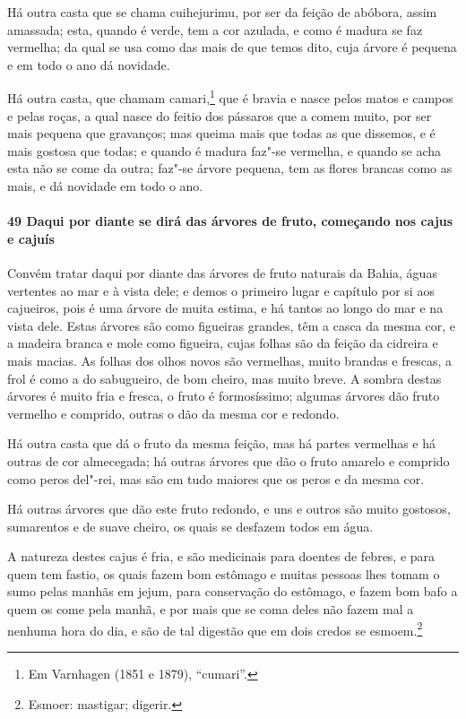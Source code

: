 Há outra casta que se chama cuihejurimu, por ser da feição de abóbora, assim amassada;
esta, quando é verde, tem a cor azulada, e como é madura se faz vermelha; da qual se usa
como das mais de que temos dito, cuja árvore é pequena e em todo o ano dá novidade.

Há outra casta, que chamam camari,\footnote{ Em Varnhagen (1851 e 1879), ``cumari''.} que
é bravia e nasce pelos matos e campos e pelas roças, a qual nasce do feitio dos pássaros
que a comem muito, por ser mais pequena que gravanços; mas queima mais que todas as que
dissemos, e é mais gostosa que todas; e quando é madura faz"-se vermelha, e quando se acha
esta não se come da outra; faz"-se árvore pequena, tem as flores brancas como as mais, e dá
novidade em todo o ano.

\paragraph{49 Daqui por diante se dirá das árvores de fruto, começando nos cajus e cajuís}

Convém tratar daqui por diante das árvores de fruto naturais da Bahia, águas vertentes ao
mar e à vista dele; e demos o primeiro lugar e capítulo por si aos cajueiros, pois é uma
árvore de muita estima, e há tantos ao longo do mar e na vista dele. Estas árvores são
como figueiras grandes, têm a casca da mesma cor, e a madeira branca e mole como figueira,
cujas folhas são da feição da cidreira e mais macias. As folhas dos olhos novos são
vermelhas, muito brandas e frescas, a frol é como a do sabugueiro, de bom cheiro, mas
muito breve. A sombra destas árvores é muito fria e fresca, o fruto é formosíssimo;
algumas árvores dão fruto vermelho e comprido, outras o dão da mesma cor e redondo.

Há outra casta que dá o fruto da mesma feição, mas há partes vermelhas e há outras de cor
almecegada; há outras árvores que dão o fruto amarelo e comprido como peros del"-rei, mas
são em tudo maiores que os peros e da mesma cor.

Há outras árvores que dão este fruto redondo, e uns e outros são muito gostosos,
sumarentos e de suave cheiro, os quais se desfazem todos em água.

A natureza destes cajus é fria, e são medicinais para doentes de febres, e para quem tem
fastio, os quais fazem bom estômago e muitas pessoas lhes tomam o sumo pelas manhãs em
jejum, para conservação do estômago, e fazem bom bafo a quem os come pela manhã, e por
mais que se coma deles não fazem mal a nenhuma hora do dia, e são de tal digestão que em
dois credos se esmoem.\footnote{ Esmoer: mastigar; digerir.}


